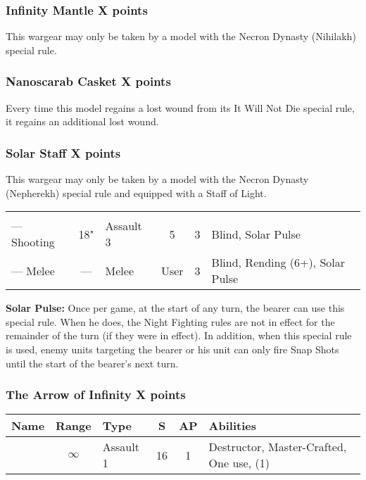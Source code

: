 \subsubsection[Infinity Mantle]{Infinity Mantle \dotfill X points}
This wargear may only be taken by a model with the Necron Dynasty (Nihilakh) special rule.

\subsubsection[Nanoscarab Casket]{Nanoscarab Casket \dotfill X points}

Every time this model regains a lost wound from its It Will Not Die special rule, it regains an additional lost wound.

\subsubsection[Solar Staff]{Solar Staff \dotfill X points}
This wargear may only be taken by a model with the Necron Dynasty (Nepherekh) special rule and equipped with a Staff of Light.

\label{Solar Staff}
\noindent
\begin{NiceTabular}{L{115 pt} c C{40pt} *{2}{c} >{\raggedright\arraybackslash}p{240pt}}
 & & &  &  &  \\
— Shooting & 18" & Assault 3 & 5 & 3 & Blind, Solar Pulse \\
— Melee & — & Melee & User & 3 & Blind, Rending (6+), Solar Pulse \\
\end{NiceTabular}

\textbf{Solar Pulse:} Once per game, at the start of any turn, the bearer can use this special rule. When he does, the Night Fighting rules are not in effect for the remainder of the turn (if they were in effect). In addition, when this special rule is used, enemy units targeting the bearer or his unit can only fire Snap Shots until the start of the bearer’s next turn.

\subsubsection[The Arrow of Infinity]{The Arrow of Infinity \dotfill X points}

\label{The Arrow of Infinity}
\noindent
\begin{NiceTabular}{L{115 pt} c C{40pt} *{2}{c} >{\raggedright\arraybackslash}p{240pt}}
	Name & Range & Type & S & AP & Abilities \\
	\hline
	  & $\infty$ & Assault 1 & 16 & 1 & Destructor, Master-Crafted, One use,  (1) \\
\end{NiceTabular}

